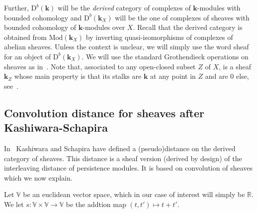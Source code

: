 \documentclass[a4paper, english, 11pt]{article}
\newcommand{\kk}[0]{\textbf{k}}
\newcommand{\Mod}[0]{\text{Mod}}
\newcommand{\0}{\vec{0}}
\newcommand{\R}[0]{\mathbb{R}}
\newcommand{\V}[0]{\mathbb{V}}
\newcommand{\D}[0]{\text{D}}
\begin{document}
\smallskip

Further, $\D^b(\kk)$ will be the \emph{derived} category of complexes of $\kk$-modules with bounded cohomology and $\D^b(\kk_X)$ will be the one of complexes of sheaves with bounded cohomology of $\kk$-modules over $X$. Recall that the derived category is obtained from $\Mod(\kk_X)$ by inverting quasi-isomorphisms of complexes of abelian sheaves.  
 Unless the context is unclear, we will simply use the word  sheaf for an object of $\D^b(\kk_X)$. 
We will use the standard Grothendieck operations on sheaves as in~\cite{Kash90}.  
Note that, associated to any open-closed subset $Z$ of $X$, is a sheaf $\kk_Z$ whose main property is that its stalks are $\kk$ at any point in $Z$ and are $0$ else, see~\cite{Kash90}.
 
\subsection{Convolution distance for sheaves after Kashiwara-Schapira}
In~\cite{KS18} Kashiwara and Schapira have defined a (pseudo)distance on the derived category of sheaves. This distance is a sheaf version (derived by design)  of the interleaving distance of persistence modules. It is based on convolution of sheaves which we now explain. 

Let  $\V$  be an euclidean vector space, which in our case of interest will simply be $\R$. We let $s: \V\times \V \to \V$ be the addtion map $(t,t')\mapsto t+t'$.  
\end{document}
